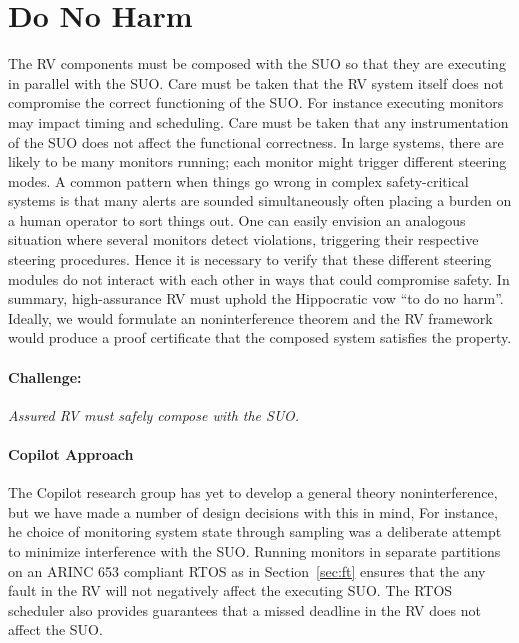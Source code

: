 \section{Do No Harm} \label{sec:noninter} The RV components must be
composed with the SUO so that they are executing in parallel with the
SUO.  Care must be taken that the RV system itself does not compromise
the correct functioning of the SUO.  For instance executing monitors
may impact timing and scheduling. Care must be taken that any
instrumentation of the SUO does not affect the functional
correctness. In large systems, there are likely to be many monitors
running; each monitor might trigger different steering modes. A common
pattern when things go wrong in complex safety-critical systems is
that many alerts are sounded simultaneously often placing a burden on
a human operator to sort things out.  One can easily envision an
analogous situation where several monitors detect violations,
triggering their respective steering procedures. Hence it is necessary
to verify that these different steering modules do not interact with
each other in ways that could compromise safety. In summary,
high-assurance RV must uphold the Hippocratic vow ``to do no harm''.
Ideally, we would formulate an noninterference theorem and the RV
framework would produce a proof certificate that the composed system
satisfies the property.


\paragraph{Challenge:} \emph{Assured RV must safely compose with the
  SUO.}

\paragraph{Copilot Approach}  
The Copilot research group has yet to develop a general theory
noninterference, but we have made a number of design decisions with
this in mind, For instance, he choice of monitoring system state
through sampling was a deliberate attempt to minimize interference
with the SUO. Running monitors in separate partitions on an ARINC 653
compliant RTOS as in Section~\ref{sec:ft} ensures that the any fault
in the RV will not negatively affect the executing SUO. The RTOS
scheduler also provides guarantees that a missed deadline in the RV
does not affect the SUO.

 

